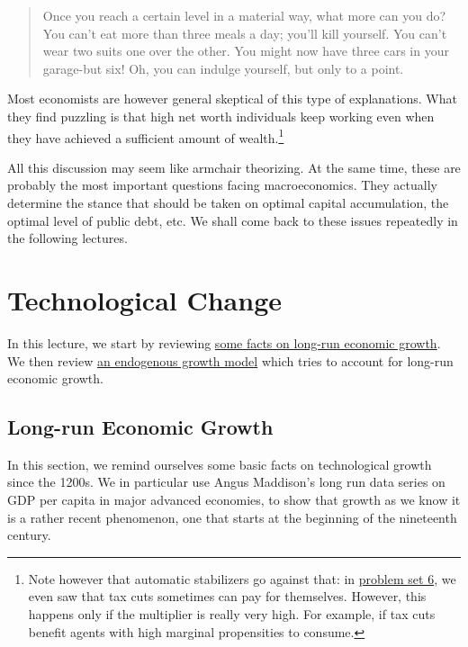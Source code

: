 \documentclass[]{book}
\let\rmarkdownfootnote\footnote%
\def\footnote{\protect\rmarkdownfootnote}
\theoremstyle{definition}
\theoremstyle{definition}
\theoremstyle{definition}
\theoremstyle{remark}
\begin{document}
\begin{quote}
Once you reach a certain level in a material way, what more can you do?
You can't eat more than three meals a day; you'll kill yourself. You
can't wear two suits one over the other. You might now have three cars
in your garage-but six! Oh, you can indulge yourself, but only to a
point.
\end{quote}

Most economists are however general skeptical of this type of
explanations. What they find puzzling is that high net worth individuals
keep working even when they have achieved a sufficient amount of
wealth.\footnote{Note however that automatic stabilizers go against
  that: in \href{pset6.html}{problem set 6}, we even saw that tax cuts
  sometimes can pay for themselves. However, this happens only if the
  multiplier is really very high. For example, if tax cuts benefit
  agents with high marginal propensities to consume.}

All this discussion may seem like armchair theorizing. At the same time,
these are probably the most important questions facing macroeconomics.
They actually determine the stance that should be taken on optimal
capital accumulation, the optimal level of public debt, etc. We shall
come back to these issues repeatedly in the following lectures.

\hypertarget{technology}{\chapter{Technological
Change}\label{technology}}

In this lecture, we start by reviewing
\protect\hyperlink{long-run-growth}{some facts on long-run economic
growth}. We then review \protect\hyperlink{endogenous-growth-model}{an
endogenous growth model} which tries to account for long-run economic
growth.

\hypertarget{long-run-growth}{\section{Long-run Economic
Growth}\label{long-run-growth}}

In this section, we remind ourselves some basic facts on technological
growth since the 1200s. We in particular use Angus Maddison's long run
data series on GDP per capita in major advanced economies, to show that
growth as we know it is a rather recent phenomenon, one that starts at
the beginning of the nineteenth century.
\end{document}
